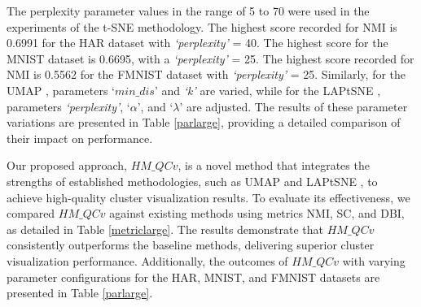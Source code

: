 The perplexity parameter values in the range of 5 to 70 were used in the experiments of the t-SNE \cite{tsne} methodology. The highest score recorded for NMI is 0.6991 for the HAR dataset with \textit{`perplexity'} = 40. The highest score for the MNIST dataset is 0.6695, with a \textit{`perplexity'} = 25. The highest score recorded for NMI is 0.5562 for the FMNIST dataset with \textit{`perplexity'} = 25. Similarly, for the UMAP \cite{umap_reference}, parameters `$min\_dis$' and \textit{`k'} are varied, while for the LAPtSNE \cite{sun2023laplacian}, parameters \textit{`perplexity'}, `$\alpha$', and `$\lambda$' are adjusted. The results of these parameter variations are presented in Table \ref{parlarge}, providing a detailed comparison of their impact on performance.

Our proposed approach, $HM\_QCv$, is a novel method that integrates the strengths of established methodologies, such as UMAP \cite{umap_reference} and LAPtSNE \cite{sun2023laplacian}, to achieve high-quality cluster visualization results. To evaluate its effectiveness, we compared $HM\_QCv$ against existing methods using metrics NMI, SC, and DBI, as detailed in Table \ref{metriclarge}. The results demonstrate that $HM\_QCv$ consistently outperforms the baseline methods, delivering superior cluster visualization performance. Additionally, the outcomes of $HM\_QCv$ with varying parameter configurations for the HAR, MNIST, and FMNIST datasets are presented in Table \ref{parlarge}.



